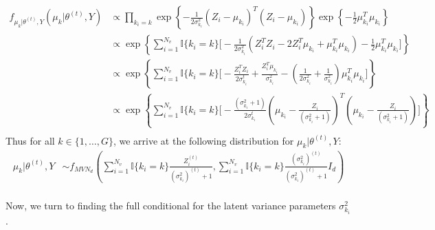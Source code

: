 \documentclass{article}
\begin{document}
\begin{align*}
f_{\mu_{k}|\theta^{(t)}, Y}(\mu_k|\theta^{(t)},Y) &\propto \prod_{k_i = k} \exp\left\{-\frac{1}{2\sigma_{k_i}^2}(Z_i - \mu_{k_i})^T(Z_i - \mu_{k_i})\right\}\exp\left\{-\frac{1}{2}\mu_{k_i}^T\mu_{k_i}\right\}\\
&\propto \exp\left\{\sum_{i = 1}^{N_v}\mathbb{I}\{k_i = k\} \Big[-\frac{1}{2\sigma_{k_i}^2}(Z_i^TZ_i - 2Z_i^T\mu_{k_i} + \mu_{k_i}^T\mu_{k_i}) - \frac{1}{2}\mu_{k_i}^T\mu_{k_i} \Big]\right\}\\
&\propto\exp\left\{\sum_{i = 1}^{N_v}\mathbb{I}\{k_i = k\} \Big[-\frac{Z_i^TZ_i}{2\sigma_{k_i}^t} + \frac{Z_i^T\mu_{k_i}}{\sigma_{k_i}^2} - \left(\frac{1}{2\sigma_{k_i}^2} + \frac{1}{\sigma_{k_i}^2}\right)\mu_{k_i}^T\mu_{k_i} \Big] \right\}\\
&\propto\exp\left\{\sum_{i = 1}^{N_v}\mathbb{I}\{k_i = k\} \Big[-\frac{(\sigma_{k_i}^2+1)}{2\sigma_{k_i}^t}\left(\mu_{k_i}-\frac{Z_i}{(\sigma_{k_i}^2+1)}\right)^T\left(\mu_{k_i}-\frac{Z_i}{(\sigma_{k_i}^2+1)}\right)\Big]\right\}\\
\end{align*}
Thus for all $k \in \{1, \ldots, G\}$, we arrive at the following distribution for $\mu_k | \theta^{(t)}, Y$:
\begin{align*}
\mu_{k}|\theta^{(t)},Y&\sim f_{{MVN}_d} \left(\sum_{i = 1}^{N_v}\mathbb{I}\{k_i = k\}\frac{Z_i^{(t)}}{(\sigma_{k_i}^2)^{(t)}+1}, \sum_{i = 1}^{N_v}\mathbb{I}\{k_i = k\}\frac{(\sigma_{k_i}^2)^{(t)}}{(\sigma_{k_i}^2)^{(t)}+1}I_d\right)\\
\end{align*}

Now, we turn to finding the full conditional for the latent variance parameters $\sigma_{k_i}^2$. 
\end{document}
